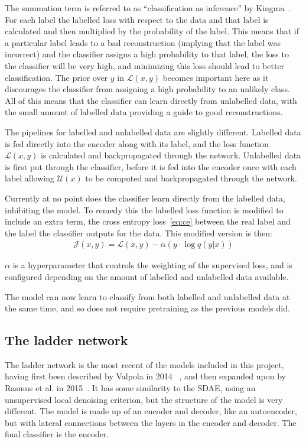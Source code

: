 The summation term is referred to as ``classification as inference'' by Kingma~\cite{DBLP:journals/corr/KingmaRMW14}. For each label the labelled loss with 
respect to the data and that label is calculated and then multiplied by the probability of the label. This means that if a particular label
leads to a bad reconstruction (implying that the label was incorrect) and the classifier assigns a high probability to that label, 
the loss to the classifier will be very high, and minimizing this loss should lead to better classification. The prior over $y$ in $\mathcal{L}(x, y)$
becomes important here as it discourages the classifier from assigning a high probability to an unlikely class. All of this means that 
the classifier can learn directly from unlabelled data, with the small amount of labelled data providing a guide to good reconstructions.

The pipelines for labelled and unlabelled data are slightly different. Labelled data is fed directly into the encoder
along with its label, and the loss function $\mathcal{L}(x, y)$ is calculated and backpropagated through the network. Unlabelled data is 
first put through the classifier, before it is fed into the encoder once with each label allowing $\mathcal{U}(x)$ to be computed and 
backpropagated through the network.

Currently at no point does the classifier learn directly from the labelled data, inhibiting the model. To remedy
this the labelled loss function is modified to include an extra term, the cross entropy loss~\eqref{eq:ce} between the real label and the 
label the classifier outputs for the data. This modified version is then:
\begin{align}
  \mathcal{J}(x, y) = \mathcal{L}(x, y) - \alpha (y \cdot \log q(y|x))
\end{align}

$\alpha$ is a hyperparameter that controls the weighting of the supervised loss, and is configured depending on the amount of labelled and 
unlabelled data available.

The model can now learn to classify from both labelled and unlabelled data at the same time, and so does not require pretraining as
the previous models did.

\subsection{The ladder network} \label{ladder}

The ladder network is the most recent of the models included in this project, having first been described by Valpola in 2014
~\cite{DBLP:journals/corr/Valpola14}, and then expanded upon by Rasmus et al. in 2015~\cite{DBLP:journals/corr/RasmusVHBR15}. 
It has some similarity to the SDAE, using an unsupervised local denoising criterion, but the structure of the model is very different.
The model is made up of an encoder and decoder, like an autoencoder, but with lateral connections between the layers in the encoder 
and decoder. The final classifier is the encoder.

